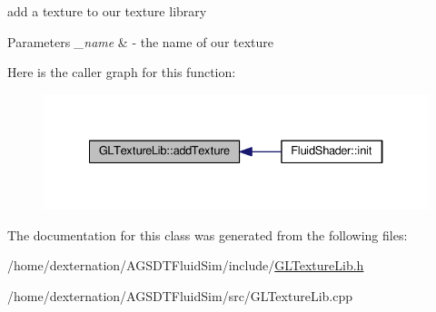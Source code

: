 add a texture to our texture library 


\begin{DoxyParams}{Parameters}
{\em \-\_\-name} & -\/ the name of our texture \\
\hline
\end{DoxyParams}


Here is the caller graph for this function\-:\nopagebreak
\begin{figure}[H]
\begin{center}
\leavevmode
\includegraphics[width=334pt]{class_g_l_texture_lib_a778cde3734906f46649defdda30d7d7e_icgraph}
\end{center}
\end{figure}




The documentation for this class was generated from the following files\-:\begin{DoxyCompactItemize}
\item 
/home/dexternation/\-A\-G\-S\-D\-T\-Fluid\-Sim/include/\hyperlink{_g_l_texture_lib_8h}{G\-L\-Texture\-Lib.\-h}\item 
/home/dexternation/\-A\-G\-S\-D\-T\-Fluid\-Sim/src/G\-L\-Texture\-Lib.\-cpp\end{DoxyCompactItemize}
